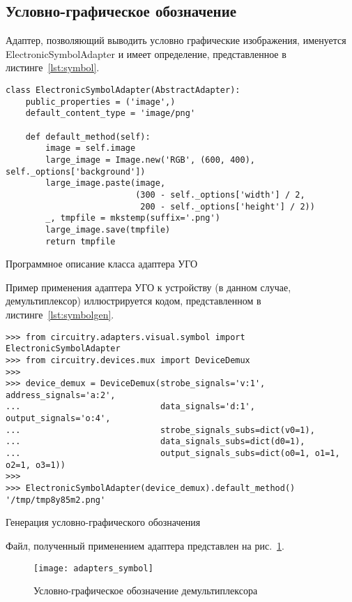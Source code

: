 \documentclass[document.tex]{subfiles}
\begin{document}
\clearpage
\subsection{Условно-графическое обозначение}
Адаптер, позволяющий выводить условно графические изображения, именуется
ElectronicSymbolAdapter и имеет определение, представленное в
листинге~\ref{lst:symbol}.

\begin{listing}[ht]
\begin{verbatim}
class ElectronicSymbolAdapter(AbstractAdapter):
    public_properties = ('image',)
    default_content_type = 'image/png'

    def default_method(self):
        image = self.image
        large_image = Image.new('RGB', (600, 400), self._options['background'])
        large_image.paste(image,
                          (300 - self._options['width'] / 2,
                           200 - self._options['height'] / 2))
        _, tmpfile = mkstemp(suffix='.png')
        large_image.save(tmpfile)
        return tmpfile
\end{verbatim}
\caption{Программное описание класса адаптера УГО}
\label{lst:symbol}
\end{listing}

Пример применения адаптера УГО к устройству (в данном случае,
демультиплексор) иллюстрируется кодом, представленном в
листинге~\ref{lst:symbolgen}.

\begin{listing}[ht]
\begin{verbatim}
>>> from circuitry.adapters.visual.symbol import ElectronicSymbolAdapter
>>> from circuitry.devices.mux import DeviceDemux
>>>
>>> device_demux = DeviceDemux(strobe_signals='v:1', address_signals='a:2',
...                            data_signals='d:1', output_signals='o:4',
...                            strobe_signals_subs=dict(v0=1),
...                            data_signals_subs=dict(d0=1),
...                            output_signals_subs=dict(o0=1, o1=1, o2=1, o3=1))
>>>
>>> ElectronicSymbolAdapter(device_demux).default_method()
'/tmp/tmp8y85m2.png'
\end{verbatim}
\caption{Генерация условно-графического обозначения}
\label{lst:symbolgen}
\end{listing}

\clearpage
Файл, полученный применением адаптера представлен на
рис.~\ref{fig:adapters_symbol}.

\begin{figure}[here]
\texttt{[image: adapters\_symbol]}
\caption{Условно-графическое обозначение демультиплексора}
\label{fig:adapters_symbol}
\end{figure}
\end{document}
